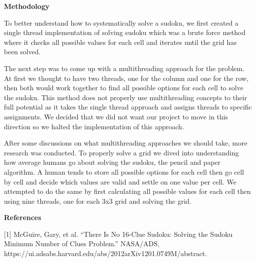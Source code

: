 \documentclass[11pt]{article}
\begin{document}
\vspace{1\baselineskip}

\begin{center}
{\Large\textbf{Methodology}}
\end{center}

\vspace{1\baselineskip}
To better understand how to systematically solve a sudoku, we first created a single thread implementation of solving sudoku which was a brute force method where it checks all possible values for each cell and iterates until the grid has been solved.

\vspace{1\baselineskip}
The next step was to come up with a multithreading approach for the problem. At first we thought to have two threads, one for the column and one for the row, then both would work together to find all possible options for each cell to solve the sudoku. This method does not properly use multithreading concepts to their full potential as it takes the single thread approach and assigns threads to specific assignments. We decided that we did not want our project to move in this direction so we halted the implementation of this approach.

\vspace{1\baselineskip}
After some discussions on what multithreading approaches we should take, more research was conducted. To properly solve a grid we dived into understanding how average humans go about solving the sudoku, the pencil and paper algorithm. A human tends to store all possible options for each cell then go cell by cell and decide which values are valid and settle on one value per cell. We attempted to do the same by  first calculating all possible values for each cell then using nine threads, one for each 3x3 grid and solving the grid. 

\begin{center}
{\Large\textbf{References}}
\end{center}

\vspace{1\baselineskip}
[1] McGuire, Gary, et al. “There Is No 16-Clue Sudoku: Solving the Sudoku Minimum Number of Clues Problem.” NASA/ADS, https://ui.adsabs.harvard.edu/abs/2012arXiv1201.0749M/abstract. 


\printbibliography
\end{document}
